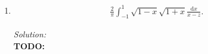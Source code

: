 \documentclass[10pt]{amsart}
\newcommand{\D}{\mathrm{d}}
\theoremstyle{nonumberplain}
\begin{document}
\begin{enumerate}[label={\bf {\arabic*}:}]
\begin{enumerate}
\item 
\begin{align*}
\frac{2}{\pi}\int_{-1}^1 {\sqrt{1-x} \sqrt{1 + x}}
\frac{\D x}{x -z}.
\end{align*}

\textit{Solution:} \\
\textbf{TODO:}
\begin{align*}
\end{align*}


\end{enumerate}

      
    


  
\end{enumerate}
\end{document}
